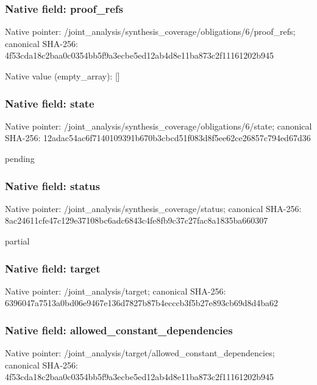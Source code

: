 \documentclass[10pt,a4paper]{article}
\begin{document}
\subsubsection{Native field: proof\_\allowbreak{}refs}
Native pointer: /joint\_\allowbreak{}analysis/synthesis\_\allowbreak{}coverage/obligations/6/proof\_\allowbreak{}refs; canonical SHA-256: 4f53cda18c2baa0c0354bb5f9a3ecbe5ed12ab4d8e11ba873c2f11161202b945

Native value (empty\_\allowbreak{}array): []

\subsubsection{Native field: state}
Native pointer: /joint\_\allowbreak{}analysis/synthesis\_\allowbreak{}coverage/obligations/6/state; canonical SHA-256: 12adac54ac6f7140109391b670b3cbcd51f083d8f5ee62ce26857c794ed67d36

\begingroup\raggedright\sloppy pending\par\endgroup

\subsubsection{Native field: status}
Native pointer: /joint\_\allowbreak{}analysis/synthesis\_\allowbreak{}coverage/status; canonical SHA-256: 8ac24611cfe47c129e37108bc6adc6843c4fe8fb9c37c27fac8a1835ba660307

\begingroup\raggedright\sloppy partial\par\endgroup

\subsubsection{Native field: target}
Native pointer: /joint\_\allowbreak{}analysis/target; canonical SHA-256: 6396047a7513a0bd06e9467e136d7827b87b4ecccb3f5b27e893cb69d8d4ba62

\subsubsection{Native field: allowed\_\allowbreak{}constant\_\allowbreak{}dependencies}
Native pointer: /joint\_\allowbreak{}analysis/target/allowed\_\allowbreak{}constant\_\allowbreak{}dependencies; canonical SHA-256: 4f53cda18c2baa0c0354bb5f9a3ecbe5ed12ab4d8e11ba873c2f11161202b945
\end{document}
